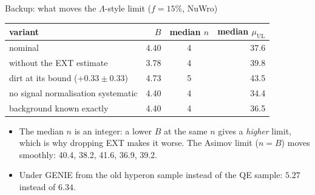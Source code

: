 \documentclass[aspectratio=169,10pt]{beamer}
\newcommand{\Lam}{\ensuremath{\Lambda}}
\newcommand{\muUL}{\ensuremath{\mu_{\mathrm{UL}}}}
\begin{document}
\begin{frame}{Backup: what moves the \Lam-style limit ($f=15\%$, NuWro)}
  \small
  \begin{center}
  \begin{tabular}{lrcr}
    \toprule
    variant & $B$ & median $n$ & median $\muUL$ \\
    \midrule
    nominal & 4.40 & 4 & 37.6 \\
    without the EXT estimate & 3.78 & 4 & 39.8 \\
    dirt at its bound ($+0.33\pm0.33$) & 4.73 & 5 & 43.5 \\
    no signal normalisation systematic & 4.40 & 4 & 34.4 \\
    background known exactly & 4.40 & 4 & 36.5 \\
    \bottomrule
  \end{tabular}
  \end{center}
  \begin{itemize}
    \item The median $n$ is an integer: a lower $B$ at the same $n$ gives a \emph{higher}
          limit, which is why dropping EXT makes it worse. The Asimov limit ($n=B$) moves
          smoothly: 40.4, 38.2, 41.6, 36.9, 39.2.
    \item Under GENIE from the old hyperon sample instead of the QE sample: $5.27$ instead
          of $6.34$.
  \end{itemize}
\end{frame}
\end{document}
